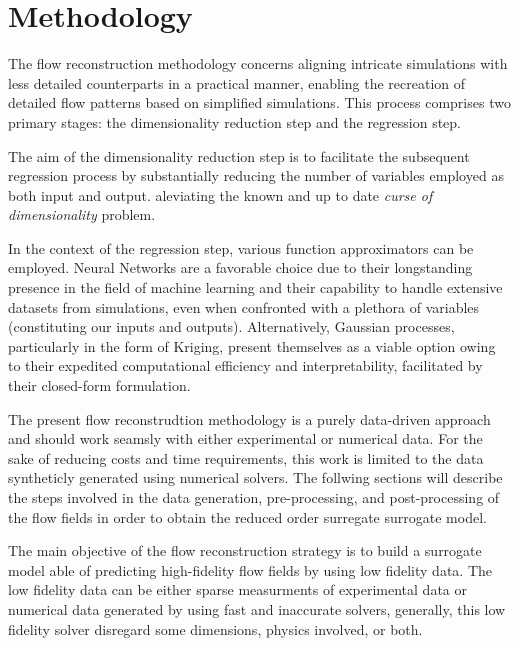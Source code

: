 


\chapter{Methodology}
\label{chap:methodology}
The flow reconstruction methodology concerns aligning intricate simulations with less detailed counterparts in a practical manner, enabling the recreation of detailed flow patterns based on simplified simulations. This process comprises two primary stages: the dimensionality reduction step and the regression step.

The aim of the dimensionality reduction step is to facilitate the subsequent regression process by substantially reducing the number of variables employed as both input and output.
aleviating the known and up to date \textit{curse of dimensionality} problem.

In the context of the regression step, various function approximators can be employed. Neural Networks are a favorable choice due to their longstanding presence in the field of machine learning and their capability to handle extensive datasets from simulations, even when confronted with a plethora of variables (constituting our inputs and outputs). Alternatively, Gaussian processes, particularly in the form of Kriging, present themselves as a viable option owing to their expedited computational efficiency and interpretability, facilitated by their closed-form formulation.

The present flow reconstrudtion methodology is a purely data-driven approach and should work seamsly with either experimental or numerical data. For the sake of reducing costs and time requirements, this work is limited to the data syntheticly generated using numerical solvers. The follwing sections will describe the steps involved in the data generation, pre-processing, and post-processing of the flow fields in order to obtain the reduced order surregate surrogate model.

The main objective of the flow reconstruction strategy is to build a surrogate model able of predicting high-fidelity flow fields by using low fidelity data. The low fidelity data can be either sparse measurments of experimental data or numerical data generated by using fast and inaccurate solvers, generally, this low fidelity solver disregard some dimensions, physics involved, or both.

